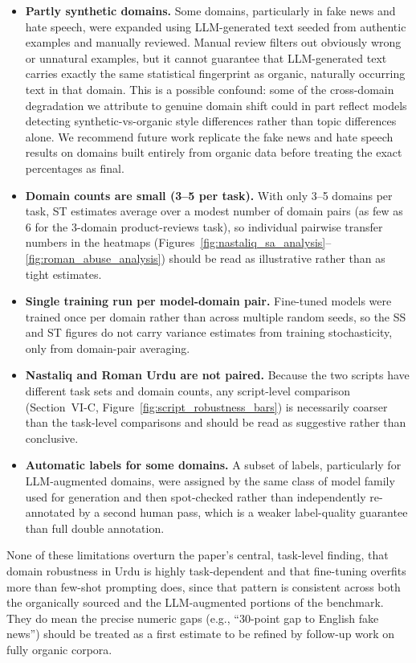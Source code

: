 \documentclass[10pt,twocolumn,journal]{IEEEtran}
\begin{document}
\begin{itemize}[leftmargin=*]
\item \textbf{Partly synthetic domains.} Some domains, particularly in fake news and hate speech, were expanded using LLM-generated text seeded from authentic examples and manually reviewed. Manual review filters out obviously wrong or unnatural examples, but it cannot guarantee that LLM-generated text carries exactly the same statistical fingerprint as organic, naturally occurring text in that domain. This is a possible confound: some of the cross-domain degradation we attribute to genuine domain shift could in part reflect models detecting synthetic-vs-organic style differences rather than topic differences alone. We recommend future work replicate the fake news and hate speech results on domains built entirely from organic data before treating the exact percentages as final.
\item \textbf{Domain counts are small (3--5 per task).} With only 3--5 domains per task, ST estimates average over a modest number of domain pairs (as few as 6 for the 3-domain product-reviews task), so individual pairwise transfer numbers in the heatmaps (Figures~\ref{fig:nastaliq_sa_analysis}--\ref{fig:roman_abuse_analysis}) should be read as illustrative rather than as tight estimates.
\item \textbf{Single training run per model-domain pair.} Fine-tuned models were trained once per domain rather than across multiple random seeds, so the SS and ST figures do not carry variance estimates from training stochasticity, only from domain-pair averaging.
\item \textbf{Nastaliq and Roman Urdu are not paired.} Because the two scripts have different task sets and domain counts, any script-level comparison (Section~VI-C, Figure~\ref{fig:script_robustness_bars}) is necessarily coarser than the task-level comparisons and should be read as suggestive rather than conclusive.
\item \textbf{Automatic labels for some domains.} A subset of labels, particularly for LLM-augmented domains, were assigned by the same class of model family used for generation and then spot-checked rather than independently re-annotated by a second human pass, which is a weaker label-quality guarantee than full double annotation.
\end{itemize}

None of these limitations overturn the paper's central, task-level finding, that domain robustness in Urdu is highly task-dependent and that fine-tuning overfits more than few-shot prompting does, since that pattern is consistent across both the organically sourced and the LLM-augmented portions of the benchmark. They do mean the precise numeric gaps (e.g., ``30-point gap to English fake news'') should be treated as a first estimate to be refined by follow-up work on fully organic corpora.
\end{document}
